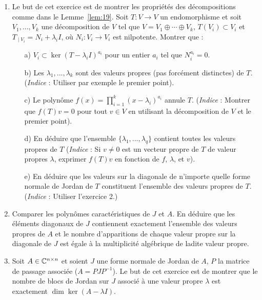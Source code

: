 \begin{enumerate}
\item Le but de cet exercice est de montrer les propriétés des décompositions comme dans le Lemme~\ref{lem:19}. \newline
Soit $T \colon V \rightarrow V$ un endomorphisme et soit $V_1, ..., V_k$ une décomposition de $V$ tel que $V = V_1 ⊕ \cdots ⊕ V_k$, $T(V_i) \subset V_i$ et $T_{∣V_i} = N_i + \lambda_i I$, où $N_i : V_i \rightarrow V_i$ est nilpotente. Montrer que :
\begin{enumerate}
\item[a)] $V_i \subset \ker (T - \lambda_i I)^{a_i}$ pour un entier $a_i$ tel que $N_i^{a_i} = 0$.
\item[b)] Les $\lambda_1, ..., \lambda_k$ sont des valeurs propres (pas forcément distinctes) de $T$. (\textit{Indice} : Utiliser par exemple le premier point).
\item[c)] Le polynôme $f(x) = \prod_{i=1}^{k} (x - \lambda_i)^{a_i}$ annule $T$. (\textit{Indice} : Montrer que $f(T)v = 0$ pour tout $v \in V$ en utilisant la décomposition de $V$ et le premier point).
\item[d)] En déduire que l'ensemble $\{ \lambda_1, ..., \lambda_q \}$ contient toutes les valeurs propres de $T$ (\textit{Indice} : Si $v \neq 0$ est un vecteur propre de $T$ de valeur propres $\lambda$, exprimer $f(T)v$ en fonction de $f$, $\lambda$, et $v$). 
\item[e)] En déduire que les valeurs sur la diagonale de n'importe quelle forme normale de Jordan de $T$ constituent l'ensemble des valeurs propres de $T$. (\textit{Indice} : Utiliser l'exercice 2.)
\end{enumerate}

\item Comparer les polynômes caractéristiques de $J$ et $A$. En déduire que les éléments diagonaux de $J$ contiennent exactement l'ensemble des valeurs propres de $A$ et le nombre d'apparitions de chaque valeur propre sur la diagonale de $J$ est égale à la multiplicité algébrique de ladite valeur propre.

\item Soit $A \in \Bbb C^{n \times n}$ et soient $J$ une forme normale de Jordan de $A$, $P$ la matrice de passage associée ($A = PJP^{-1}$). \newline 
Le but de cet exercice est de montrer que le nombre de blocs de Jordan sur $J$ associé à une valeur propre $\lambda$ est exactement $\dim \ker(A - \lambda I)$.
\begin{enumerate}


\end{enumerate}
\end{enumerate}
